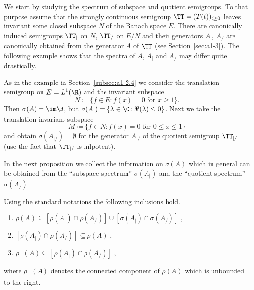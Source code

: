 We start by studying the spectrum of subspace and quotient semigroups.
To that purpose assume that the strongly continuous semigroup $\TT = (T(t))_{t \geq 0}$ leaves invariant some closed subspace $N$ of the Banach space $E$.
There are canonically induced semigroups $\TT_{|}$ on $N$, \resp $\TT_{/}$ on $E/N$ and their generators $A_{|}$, \resp $A_{/}$ are canonically obtained from the generator $A$ of\/ $\TT$ (see Section~\ref{sec:a1-3}).
The following example shows that the spectra of\/ $A$, $A_{|}$ and $A_{/}$ may differ quite drastically.
\begin{example}\label{ex:a3-4.1}
As in the example in Section~\ref{subsec:a1-2.4} we consider the translation semigroup on $E = L^{1}(\R)$ and the 
invariant subspace 
%
\[
	N \coloneq \{f \in E \colon f(x) = 0 \text{ for } x \geq 1\} .
\]
%
Then $\sigma(A) = \im\R$, but $\sigma(A_{|}) = \{\lambda \in \C \colon \Re(\lambda) \leq 0\}$.
Next we take the translation invariant subspace 
%
\[
	M \coloneq \{f \in N \colon f(x) = 0 \text{ for } 0 \leq x \leq 1\}
\]
%
and obtain $\sigma(A_{|/}) = \emptyset$ for the generator $A_{|/}$ of the quotient semigroup $\TT_{|/}$ (use the fact that $\TT_{|/}$ is nilpotent).
\end{example}
In the next proposition we collect the information on $\sigma(A)$ which in general can be obtained from the \enquote{subspace spectrum} $\sigma(A_{|})$ and the \enquote{quotient spectrum} $\sigma(A_{/})$.
\begin{proposition}\label{prop:a3-4.2}
Using the standard notations the following inclusions hold.
\begin{enumerate}[\upshape (i)]
\item 
$\rho(A) \subseteq [\rho(A_{|}) \cap \rho(A_{/})] \cup [\sigma(A_{|}) \cap \sigma(A_{/})]$ ,

\item 
$[\rho(A_{|}) \cap \rho(A_{/})] \subseteq \rho(A) $ ,

\item 
$\rho_{+}(A) \subseteq [\rho(A_{|}) \cap \rho(A_{/})]$ ,
\end{enumerate}
 where $\rho_{+}(A)$ denotes the connected component of\/ $\rho(A)$ which is unbounded to the right.

\end{proposition}
